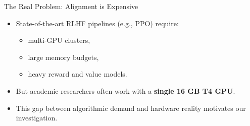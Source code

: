 \documentclass[10pt]{beamer}
\begin{document}
\begin{frame}{The Real Problem: Alignment is Expensive}
\large
\begin{itemize}
    \item State-of-the-art RLHF pipelines (e.g., PPO) require:
    \begin{itemize}
        \item multi-GPU clusters,
        \item large memory budgets,
        \item heavy reward and value models.
    \end{itemize}
    \vspace{0.35cm}
    \item But academic researchers often work with a \textbf{single 16 GB T4 GPU}.
    \vspace{0.35cm}
    \item This gap between algorithmic demand and hardware reality motivates our investigation.
\end{itemize}


\end{frame}
\end{document}
